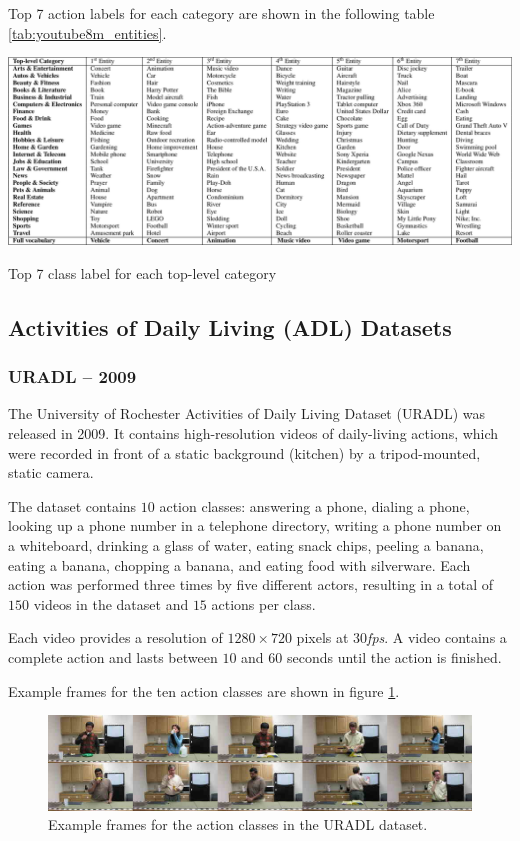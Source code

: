Top 7 action labels for each category are shown in the following table \ref{tab:youtube8m_entities}.

\begin{table}[H]
    \centering
    \includegraphics[width=\textwidth]{img_datasets/youtube8m_entities}
    \caption{Top 7 class label for each top-level category \cite{abu-el-haija_youtube-8m:_2016}}
    \label{tab:youtube8m_entities}
\end{table}


\subsection{Activities of Daily Living (ADL) Datasets}

\subsubsection{URADL -- 2009}
The University of Rochester Activities of Daily Living Dataset (URADL) \cite{messing_activity_2009} was released in 2009.
It contains high-resolution videos of daily-living actions, which were recorded in front of a static background (kitchen) by a tripod-mounted, static camera.

The dataset contains $10$ action classes: answering a phone, dialing a phone, looking up a phone number in a telephone directory, writing a phone number on a whiteboard, drinking a glass of water, eating snack chips, peeling a banana, eating a banana, chopping a banana, and eating food with silverware.
Each action was performed three times by five different actors, resulting in a total of $150$ videos in the dataset and $15$ actions per class.

Each video provides a resolution of $1280 \times 720$ pixels at $30$\textit{fps}.
A video contains a complete action and lasts between $10$ and $60$ seconds until the action is finished.

Example frames for the ten action classes are shown in figure \ref{fig:uradl_example}.
\begin{figure}[H]
    \centering
    \includegraphics[width=\textwidth]{img_datasets/uradl_example}
    \caption{Example frames for the action classes in the URADL dataset. \cite{_university_????}}
    \label{fig:uradl_example}
\end{figure}


